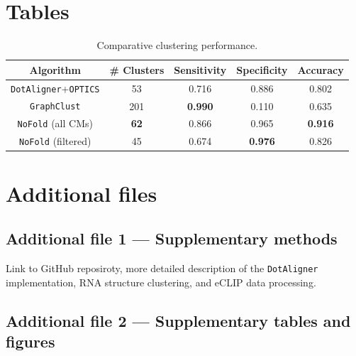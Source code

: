 \documentclass{bmcart}
\newcommand\dotaligner{\texttt{DotAligner}}
\newcommand\nofold{\texttt{NoFold}}
\begin{document}
\begin{backmatter}

\section*{Tables}

\begin{table}[h!]
\caption{ Comparative clustering performance. }
 \begin{tabular}{ccccc}
 \hline
 Algorithm & \# Clusters & Sensitivity & Specificity & Accuracy \\
 \hline
 \dotaligner{}+\texttt{OPTICS} & 53 & 0.716 & 0.886& 0.802\\
 \texttt{GraphClust} & 201 & \textbf{0.990} & 0.110 & 0.635\\ %
 \nofold{} (all CMs) & \textbf{62} & 0.866 & 0.965 & \textbf{0.916 }\\ %
 \nofold{} (filtered) & 45 & 0.674 & \textbf{0.976} & 0.826\\ %
 \hline
 \end{tabular}
\end{table}





\section*{Additional files}

  \subsection*{Additional file 1 --- Supplementary methods}

    Link to GitHub reposiroty, more detailed description of the \dotaligner{} implementation, RNA structure clustering, and eCLIP data processing. 

  \subsection*{Additional file 2 --- Supplementary tables and figures}


\end{backmatter}
\end{document}
